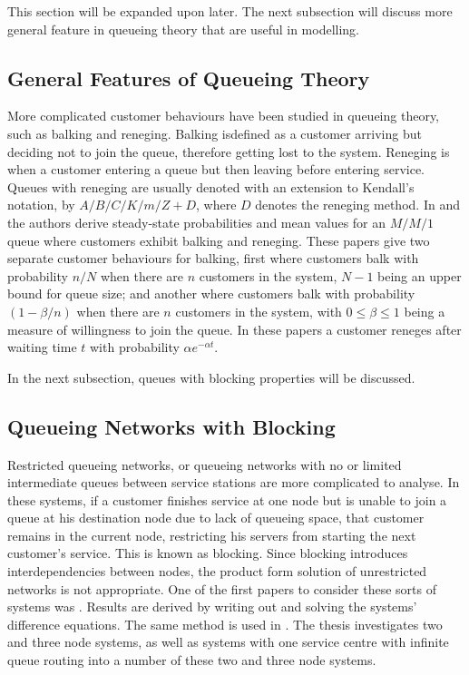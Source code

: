 \documentclass{article}
\begin{document}
This section will be expanded upon later.
The next subsection will discuss more general feature in queueing theory that are useful in modelling.

\subsection{General Features of Queueing Theory}

More complicated customer behaviours have been studied in queueing theory, such
as balking and reneging.
Balking isdefined as a customer arriving but deciding not to join the queue,
therefore getting lost to the system.
Reneging is when a customer entering a queue but then leaving before entering service.
Queues with reneging are usually denoted with an extension to Kendall's notation, by $A/B/C/K/m/Z + D$, where $D$ denotes the reneging method.
In \cite{anckerjrgafarian63a} and \cite{anckerjrgafarian63b} the authors derive steady-state probabilities and mean values for an $M/M/1$ queue where customers exhibit balking and reneging.
These papers give two separate customer behaviours for balking, first where customers balk with probability $n/N$ when there are $n$ customers in the system, $N-1$ being an upper bound for queue size; and another where customers balk with probability $(1-\beta/n)$ when there are $n$ customers in the system, with $0\leq\beta\leq1$ being a measure of willingness to join the queue.
In these papers a customer reneges after waiting time $t$ with probability $\alpha e^{-\alpha t}$.

In the next subsection, queues with blocking properties will be discussed.

\subsection{Queueing Networks with Blocking}

Restricted queueing networks, or queueing networks with no or limited intermediate queues between service stations are more complicated to analyse.
In these systems, if a customer finishes service at one node but is unable to join a queue at his destination node due to lack of queueing space, that customer remains in the current node, restricting his servers from starting the next customer's service.
This is known as blocking.
Since blocking introduces interdependencies between nodes, the product form
solution of unrestricted networks is not appropriate.
One of the first papers to consider these sorts of systems was \cite{hunt56}.
Results are derived by writing out and solving the systems' difference equations.
The same method is used in \cite{baber08}.
The thesis investigates two and three node systems, as well as systems with one
service centre with infinite queue routing into a number of these two and three node systems.
\end{document}
